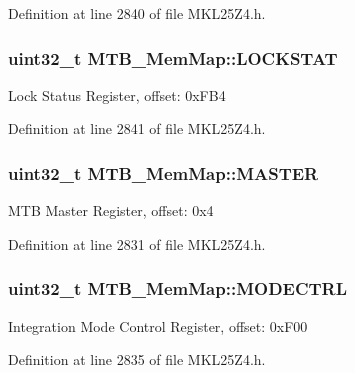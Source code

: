 Definition at line 2840 of file M\+K\+L25\+Z4.\+h.

\subsubsection[{\texorpdfstring{L\+O\+C\+K\+S\+T\+AT}{LOCKSTAT}}]{\setlength{\rightskip}{0pt plus 5cm}uint32\+\_\+t M\+T\+B\+\_\+\+Mem\+Map\+::\+L\+O\+C\+K\+S\+T\+AT}\hypertarget{struct_m_t_b___mem_map_aac267fb66879aa477f7e0185507d688b}{}\label{struct_m_t_b___mem_map_aac267fb66879aa477f7e0185507d688b}
Lock Status Register, offset\+: 0x\+F\+B4 

Definition at line 2841 of file M\+K\+L25\+Z4.\+h.

\subsubsection[{\texorpdfstring{M\+A\+S\+T\+ER}{MASTER}}]{\setlength{\rightskip}{0pt plus 5cm}uint32\+\_\+t M\+T\+B\+\_\+\+Mem\+Map\+::\+M\+A\+S\+T\+ER}\hypertarget{struct_m_t_b___mem_map_a4398e867901c87b7b9d86f7a4730d1c2}{}\label{struct_m_t_b___mem_map_a4398e867901c87b7b9d86f7a4730d1c2}
M\+TB Master Register, offset\+: 0x4 

Definition at line 2831 of file M\+K\+L25\+Z4.\+h.

\subsubsection[{\texorpdfstring{M\+O\+D\+E\+C\+T\+RL}{MODECTRL}}]{\setlength{\rightskip}{0pt plus 5cm}uint32\+\_\+t M\+T\+B\+\_\+\+Mem\+Map\+::\+M\+O\+D\+E\+C\+T\+RL}\hypertarget{struct_m_t_b___mem_map_afb3fb2741fa86e77bf0e514f4d4dc96e}{}\label{struct_m_t_b___mem_map_afb3fb2741fa86e77bf0e514f4d4dc96e}
Integration Mode Control Register, offset\+: 0x\+F00 

Definition at line 2835 of file M\+K\+L25\+Z4.\+h.

